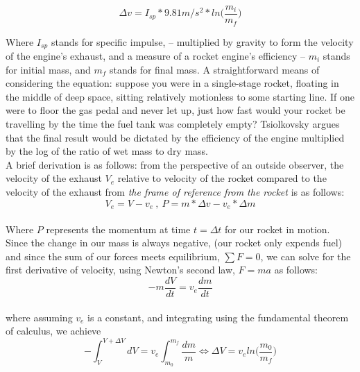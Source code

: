 \documentclass{article}
\begin{document}
$$ \Delta v =  I_{sp} * 9.81 m/s^2 * ln \Bigg( \frac{m_i}{m_f} \Bigg)  $$ 

Where $I_{sp}$ stands for specific impulse, -- multiplied by gravity to form the velocity of the engine's exhaust, and a measure of a rocket engine's efficiency -- $m_i$ stands for initial mass, and $m_f$ stands for final mass. A straightforward means of considering the equation: suppose you were in a single-stage rocket, floating in the middle of deep space, sitting relatively motionless to some starting line. If one were to floor the gas pedal and never let up, just how fast would your rocket be travelling by the time the fuel tank was completely empty? Tsiolkovsky argues that the final result would be dictated by the efficiency of the engine multiplied by the log of the ratio of wet mass to dry mass. \\

A brief derivation is as follows: \cite{rocket} from the perspective of an outside observer, the velocity of the exhaust $V_e$ relative to velocity of the rocket compared to the velocity of the exhaust from \textit{the frame of reference from the rocket} is as follows: \\

$$ V_e = V - v_e \ , \ P= m* \Delta v - v_e * \Delta m $$\\

Where $P$ represents the momentum at time $t = \Delta t$ for our rocket in motion. Since the change in our mass is always negative, (our rocket only expends fuel) and since the sum of our forces meets equilibrium, $\sum F = 0$, we can solve for the first derivative of velocity, using Newton's second law, $F=ma$ as follows: \\

$$ -m \frac{dV}{dt} = v_e \frac{dm}{dt} $$ \\

where assuming $v_e$ is a constant, and integrating using the fundamental theorem of calculus, we achieve \\

$$ - \int^{V+\Delta V}_{V} dV = v_e \int^{m_f}_{m_0} \frac{dm}{m} \Longleftrightarrow \Delta V = v_e ln \Bigg( \frac{m_0}{m_f} \Bigg) $$ \\
\end{document}
